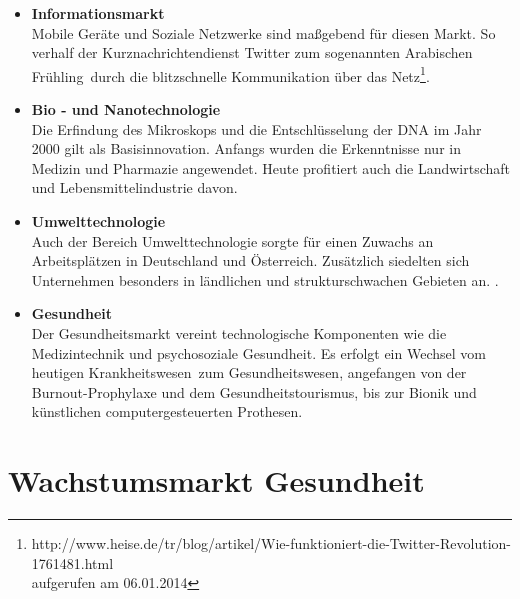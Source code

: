 \begin{itemize}
  \item \textbf{Informationsmarkt} \\
  		Mobile Geräte und Soziale Netzwerke sind maßgebend für diesen Markt. So verhalf der Kurznachrichtendienst Twitter zum sogenannten \glqq Arabischen Frühling\grqq\, durch die blitzschnelle Kommunikation über das Netz\footnote{http://www.heise.de/tr/blog/artikel/Wie-funktioniert-die-Twitter-Revolution-1761481.html \\aufgerufen am 06.01.2014}.
  \item \textbf{Bio - und Nanotechnologie} \\
  		Die Erfindung des Mikroskops und die Entschlüsselung der DNA im Jahr 2000 gilt als Basisinnovation. Anfangs wurden die Erkenntnisse nur in Medizin und Pharmazie angewendet. Heute profitiert auch die Landwirtschaft und Lebensmittelindustrie davon.
  \item \textbf{Umwelttechnologie}\\
  		Auch der Bereich Umwelttechnologie sorgte für einen Zuwachs an Arbeitsplätzen in Deutschland und Österreich. Zusätzlich siedelten sich Unternehmen besonders in ländlichen und strukturschwachen Gebieten an. \cite[S. 107]{nefiodow:gesundheit}.
  \item \textbf{Gesundheit}\\
  		Der Gesundheitsmarkt vereint technologische Komponenten wie die Medizintechnik und psychosoziale Gesundheit. Es erfolgt ein Wechsel vom heutigen \glqq Krankheitswesen\grqq\ zum Gesundheitswesen, angefangen von der Burnout-Prophylaxe und dem  Gesundheitstourismus, bis zur Bionik und künstlichen computergesteuerten Prothesen.
\end{itemize}

\section{Wachstumsmarkt Gesundheit}

